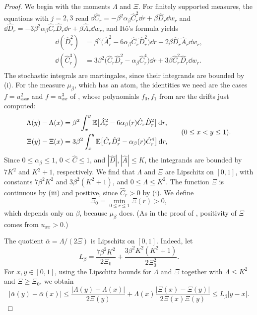 \begin{proof}
We begin with the moments $\Lambda$ and $\Xi$. For finitely supported
measures, the equations \cite[(2.17)]{Lopatto} with $j=2,3$ read
$\dd\hat C_r=-\beta^2\alpha_\beta\hat C_r^2\dd r+\beta\hat D_r\dd w_r$ and
$\dd\hat D_r=-3\beta^2\alpha_\beta\hat C_r\hat D_r\dd r+\beta\hat A_r\dd w_r$,
and It\^o's formula yields
\[
 \begin{aligned}
 \dd(\hat D_r^2)&=\beta^2\bigl(\hat A_r^2-6\alpha_\beta\hat C_r\hat D_r^2\bigr)\dd r
 +2\beta\hat D_r\hat A_r\dd w_r,\\
 \dd(\hat C_r^3)&=3\beta^2\bigl(\hat C_r\hat D_r^2-\alpha_\beta\hat C_r^4\bigr)\dd r
 +3\beta\hat C_r^2\hat D_r\dd w_r .
 \end{aligned}
\]
The stochastic integrals are martingales, since their integrands are bounded
by (i). For the measure $\mu_\beta$, which has an atom, the identities we need
are the cases $f=u_{xxx}^2$ and $f=u_{xx}^3$ of \cite[(2.16)]{Lopatto}, whose
polynomials $f_0,f_1$ from \cite[(2.18)]{Lopatto} are the drifts just
computed:
\[
 \begin{aligned}
 \Lambda(y)-\Lambda(x)&=\beta^2\int_x^y
 \mathbb E\bigl[\hat A_r^2-6\alpha_\beta(r)\hat C_r\hat D_r^2\bigr]\,\mathrm d r,\\
 \Xi(y)-\Xi(x)&=3\beta^2\int_x^y
 \mathbb E\bigl[\hat C_r\hat D_r^2-\alpha_\beta(r)\hat C_r^4\bigr]\,\mathrm d r,
 \end{aligned}
 \qquad(0\le x<y\le1).
\]
Since $0\le\alpha_\beta\le1$, $0<\hat C\le1$, and $|\hat D|,|\hat A|\le K$, the
integrands are bounded by $7K^2$ and $K^2+1$, respectively. We find that
$\Lambda$ and $\Xi$ are Lipschitz on $[0,1]$, with constants $7\beta^2K^2$ and
$3\beta^2(K^2+1)$, and $0\le\Lambda\le K^2$. The function $\Xi$ is continuous
by (iii) and positive, since $\hat C_r>0$ by (i). We define
\[
 \Xi_0=\min_{0\le r\le1}\Xi(r)>0,
\]
which depends only on $\beta$, because $\mu_\beta$ does. (As in the proof of
\cite[Lemma~6.2]{Lopatto}, positivity of $\Xi$ comes from $u_{xx}>0$.)

The quotient $\bar\alpha=\Lambda/(2\Xi)$ is Lipschitz on $[0,1]$. Indeed, let
\[
 L_\beta=\frac{7\beta^2K^2}{2\Xi_0}+\frac{3\beta^2K^2(K^2+1)}{2\Xi_0^2}.
\]
For $x,y\in[0,1]$, using the Lipschitz bounds for $\Lambda$ and $\Xi$
together with $\Lambda\le K^2$ and $\Xi\ge\Xi_0$, we obtain
\[
 |\bar\alpha(y)-\bar\alpha(x)|
 \le\frac{|\Lambda(y)-\Lambda(x)|}{2\Xi(y)}
 +\Lambda(x)\frac{|\Xi(x)-\Xi(y)|}{2\Xi(x)\Xi(y)}
 \le L_\beta|y-x| .
\]


\end{proof}
